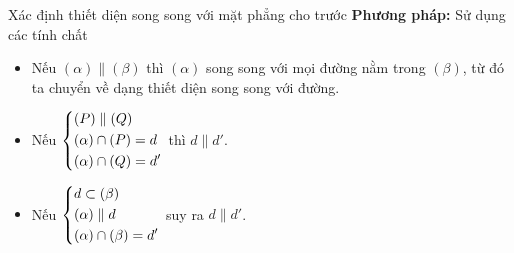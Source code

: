 \begin{dang}{Xác định thiết diện song song với mặt phẳng cho trước}
{\bf Phương pháp:} Sử dụng các tính chất
\begin{itemize}
\item Nếu $(\alpha)\parallel (\beta)$ thì $(\alpha)$ song song với mọi đường nằm trong $(\beta)$, từ đó ta chuyển về dạng thiết diện song song với đường.
\item Nếu $\left\{\begin{aligned}&(P)\parallel (Q)\\ &(\alpha)\cap (P)=d\\ &(\alpha)\cap (Q)=d'\end{aligned}\right.$ thì $d\parallel d'$.
\item Nếu $\left\{\begin{aligned}&d\subset (\beta)\\ &(\alpha)\parallel d\\ &(\alpha)\cap (\beta)=d'\end{aligned}\right.$ suy ra $d\parallel d'$.
\end{itemize}
\end{dang}

